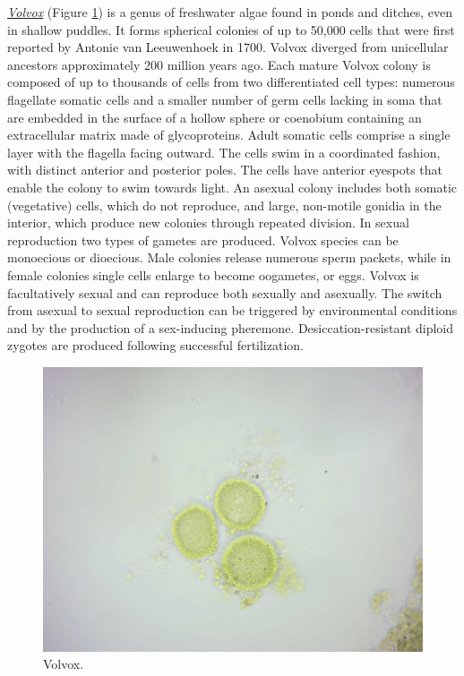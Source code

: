 \href{https://en.wikipedia.org/wiki/Volvox}{\emph{Volvox}} (Figure
\ref{fig:volvox}) is a genus of freshwater algae found in ponds and
ditches, even in shallow puddles. It forms spherical colonies of up to
50,000 cells that were first reported by Antonie van Leeuwenhoek in
1700. Volvox diverged from unicellular ancestors approximately 200
million years ago. Each mature Volvox colony is composed of up to
thousands of cells from two differentiated cell types: numerous
flagellate somatic cells and a smaller number of germ cells lacking in
soma that are embedded in the surface of a hollow sphere or coenobium
containing an extracellular matrix made of glycoproteins. Adult somatic
cells comprise a single layer with the flagella facing outward. The
cells swim in a coordinated fashion, with distinct anterior and
posterior poles. The cells have anterior eyespots that enable the colony
to swim towards light. An asexual colony includes both somatic
(vegetative) cells, which do not reproduce, and large, non-motile
gonidia in the interior, which produce new colonies through repeated
division. In sexual reproduction two types of gametes are produced.
Volvox species can be monoecious or dioecious. Male colonies release
numerous sperm packets, while in female colonies single cells enlarge to
become oogametes, or eggs. Volvox is facultatively sexual and can
reproduce both sexually and asexually. The switch from asexual to sexual
reproduction can be triggered by environmental conditions and by the
production of a sex-inducing pheremone. Desiccation-resistant diploid
zygotes are produced following successful fertilization.

\begin{figure}

{\centering \includegraphics[width=0.7\linewidth]{./figures/protists/Volvox}

}

\caption{Volvox.}\label{fig:volvox}
\end{figure}

